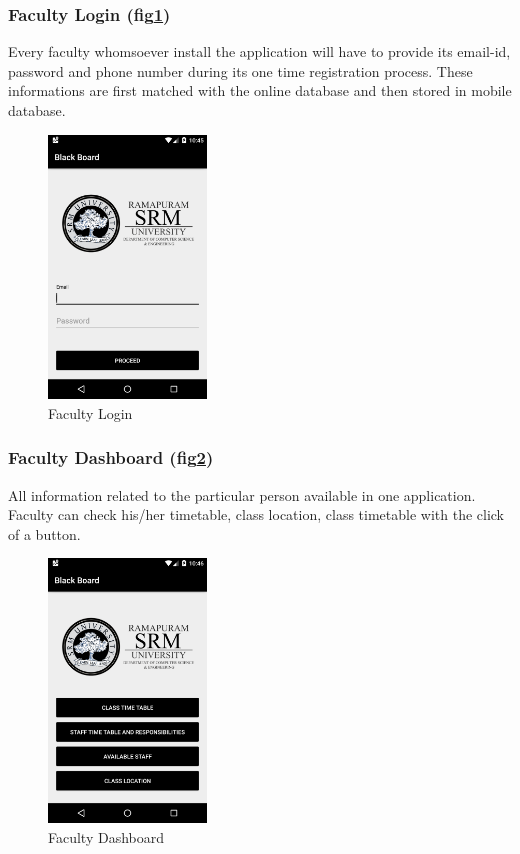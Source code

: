 \documentclass[BTech]{srmuthesis}
\begin{document}
\subsubsection{Faculty Login (fig\ref{fig:faculty-login})}
Every faculty whomsoever install the
application will have to provide its email-id, password and
phone number during its one time registration process. These
informations are first matched with the online database and then
stored in mobile database.
\begin{figure}[htbp]
	\centering
	\includegraphics[width=\linewidth, height=7cm,keepaspectratio]{login}
	\caption{Faculty Login}
	\label{fig:faculty-login}
\end{figure}
\subsubsection{Faculty Dashboard (fig\ref{fig:faculty-dashboard})}
All information related to the particular person
available in one application. Faculty can check his/her timetable, class location, class timetable with the click of a button.
\begin{figure}[htbp]
	\centering
	\includegraphics[width=\linewidth, height=7cm,keepaspectratio]{facultydashboard}
\caption{Faculty Dashboard}
\label{fig:faculty-dashboard}
\end{figure} 
\end{document}
